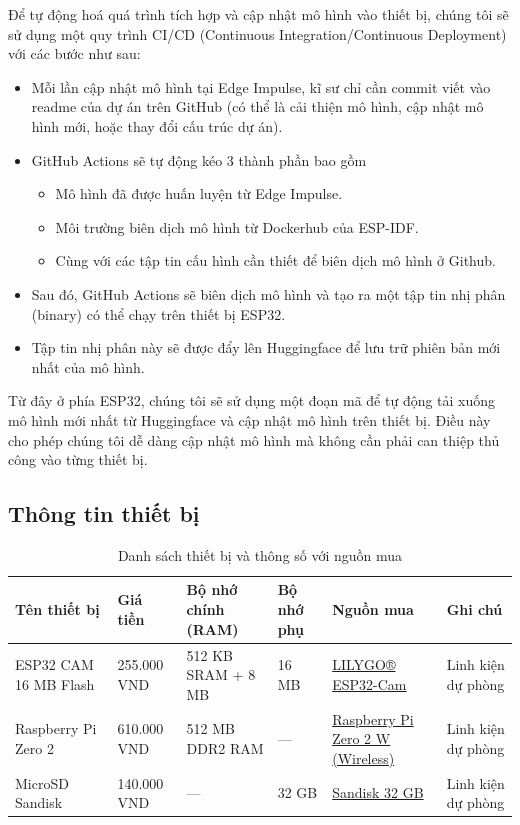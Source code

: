\quad Để tự động hoá quá trình tích hợp và cập nhật mô hình vào thiết bị, chúng tôi sẽ sử dụng một quy trình CI/CD (Continuous Integration/Continuous Deployment) với các bước như sau:
\begin{itemize}
    \item Mỗi lần cập nhật mô hình tại Edge Impulse, kĩ sư chỉ cần commit viết vào readme của dự án trên GitHub (có thể là cải thiện mô hình, cập nhật mô hình mới, hoặc thay đổi cấu trúc dự án).
    \item GitHub Actions sẽ tự động kéo 3 thành phần bao gồm
    \begin{itemize}
        \item Mô hình đã được huấn luyện từ Edge Impulse.
        \item Môi trường biên dịch mô hình từ Dockerhub của ESP-IDF.
        \item Cùng với các tập tin cấu hình cần thiết để biên dịch mô hình ở Github.
    \end{itemize}
    \item Sau đó, GitHub Actions sẽ biên dịch mô hình và tạo ra một tập tin nhị phân (binary) có thể chạy trên thiết bị ESP32.
    \item Tập tin nhị phân này sẽ được đẩy lên Huggingface để lưu trữ phiên bản mới nhất của mô hình.
\end{itemize}

\quad Từ đây ở phía ESP32, chúng tôi sẽ sử dụng một đoạn mã để tự động tải xuống mô hình mới nhất từ Huggingface và cập nhật mô hình trên thiết bị. Điều này cho phép chúng tôi dễ dàng cập nhật mô hình mà không cần phải can thiệp thủ công vào từng thiết bị.

\pagebreak
\subsection{Thông tin thiết bị}

\begin{table}[h!]
    \centering
    \caption{Danh sách thiết bị và thông số với nguồn mua}
    \begin{tabular}{|p{3cm}|p{2.5cm}|p{2cm}|p{2.5cm}|p{3cm}|p{1.75cm}|}
        \hline
        \textbf{Tên thiết bị} & \textbf{Giá tiền} & \textbf{Bộ nhớ chính (RAM)} & \textbf{Bộ nhớ phụ} & \textbf{Nguồn mua} & \textbf{Ghi chú} \\ \hline
        ESP32 CAM 16 MB Flash & 255.000 VND & 512 KB SRAM + 8 MB & 16 MB & \href{https://vi.aliexpress.com/item/1005005059816321.html?gatewayAdapt=glo2vnm}{LILYGO® ESP32-Cam} & Linh kiện dự phòng \\ \hline
        Raspberry Pi Zero 2 & 610.000 VND & 512 MB DDR2 RAM & — & \href{https://raspberrypi.vn/san-pham/raspberry-pi-zero-2-w-wireless}{Raspberry Pi Zero 2 W (Wireless)} & Linh kiện dự phòng \\ \hline
        MicroSD Sandisk & 140.000 VND & — & 32 GB & \href{https://raspberrypi.vn/san-pham/the-nho-microsd-sandisk-32gb-100mb-s}{Sandisk 32 GB} & Linh kiện dự phòng \\ \hline
    \end{tabular}
\end{table}

